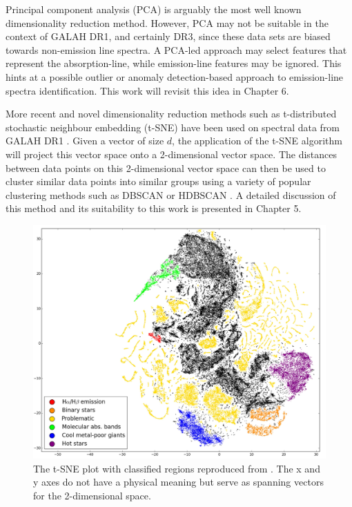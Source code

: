Principal component analysis (PCA) is arguably the most well known dimensionality reduction method. However, PCA may not be suitable in the context of GALAH DR1, and certainly DR3, since these data sets are biased towards non-emission line spectra. A PCA-led approach may select features that represent the absorption-line, while emission-line features may be ignored. This hints at a possible outlier or anomaly detection-based approach to emission-line spectra identification. This work will revisit this idea in Chapter 6.

More recent and novel dimensionality reduction methods such as t-distributed stochastic neighbour embedding (t-SNE) \citep{van2008visualizing} have been used on spectral data from GALAH DR1 \citep{traven2017galah}. Given a vector of size $d$, the application of the t-SNE algorithm will project this vector space onto a 2-dimensional vector space. The distances between data points on this 2-dimensional vector space can then be used to cluster similar data points into similar groups using a variety of popular clustering methods such as DBSCAN \citep{ester1996density} or HDBSCAN \citep{campello2013density}. A detailed discussion of this method and its suitability to this work is presented in Chapter 5.

\begin{figure}[!htb]
\centering
\includegraphics[scale=0.36]{figures/tsne traven.png}
\caption{The t-SNE plot with classified regions reproduced from \citet{traven2017galah}. The x and y axes do not have a physical meaning but serve as spanning vectors for the 2-dimensional space.}
\end{figure}

